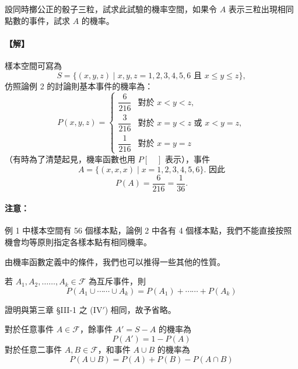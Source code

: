 \medskip
\begin{example}\label{ex:b5-4-1}
設同時擲公正的骰子三粒，試求此試驗的機率空間，如果令 $A$ 表示三粒出現相同點數的事件，試求 $A$ 的機率。
\end{example}
\paragraph{【解】}
樣本空間可寫為
\[
S = \{(x, y, z) \mid x, y, z = 1, 2, 3, 4, 5, 6 \text{ 且 } x \le y \le z\},
\]
仿照論例 2 的討論則基本事件的機率為：
\[
P(x, y, z) = \begin{cases}
\dfrac{6}{216} & \text{對於 } x < y < z, \\[8pt]
\dfrac{3}{216} & \text{對於 } x = y < z \text{ 或 } x < y = z, \\[8pt]
\dfrac{1}{216} & \text{對於 } x = y = z
\end{cases}
\]
（有時為了清楚起見，機率函數也用 $P[\quad]$ 表示），事件
\[
A = \{(x, x, x) \mid x = 1, 2, 3, 4, 5, 6\}. \text{ 因此}
\]
\[
P(A) = \frac{6}{216} = \frac{1}{36}.
\]

\medskip
\paragraph{注意：}
例 1 中樣本空間有 56 個樣本點，論例 2 中各有 4 個樣本點，我們不能直接按照機會均等原則指定各樣本點有相同機率。

由機率函數定義中的條件，我們也可以推得一些其他的性質。

\medskip
\begin{theorem}\label{thm:b5-4-1}
若 $A_1, A_2, \dots\dots, A_k \in \mathscr{F}$ 為互斥事件，則
\begin{equation}
P(A_1 \cup \cdots\cdots \cup A_k) = P(A_1) + \cdots\cdots + P(A_k) \label{eq:b5-ch4-1}
\end{equation}
\end{theorem}
證明與第三章 §III-1 之 ($\text{IV}'$) 相同，故予省略。

\medskip
\begin{theorem}\label{thm:b5-4-2}
對於任意事件 $A \in \mathscr{F}$，餘事件 $A' = S - A$ 的機率為
\begin{equation}
P(A') = 1 - P(A) \label{eq:b5-ch4-2}
\end{equation}
對於任意二事件 $A, B \in \mathscr{F}$，和事件 $A \cup B$ 的機率為
\begin{equation}
P(A \cup B) = P(A) + P(B) - P(A \cap B) \label{eq:b5-ch4-3}
\end{equation}
\end{theorem}
